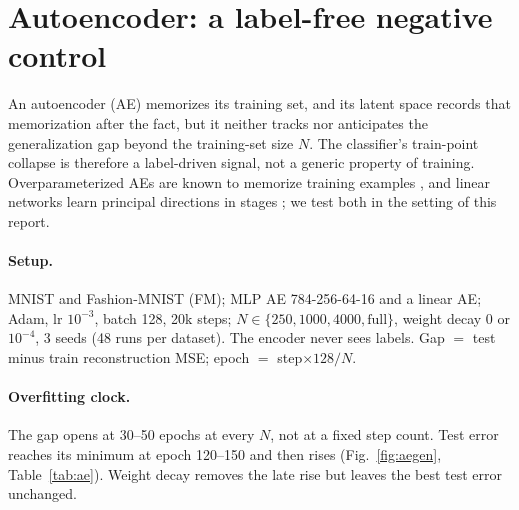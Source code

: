 \documentclass[10pt]{article}
\begin{document}
\section{Autoencoder: a label-free negative control}\label{sec:ae}
An autoencoder (AE) memorizes its training set, and its latent space records that memorization after the fact, but it neither tracks nor anticipates the generalization gap beyond the training-set size $N$. The classifier's train-point collapse is therefore a label-driven signal, not a generic property of training. Overparameterized AEs are known to memorize training examples \citep{radhakrishnan2018memorization,radhakrishnan2020overparameterized}, and linear networks learn principal directions in stages \citep{saxe2014exact,saxe2019mathematical}; we test both in the setting of this report.

\paragraph{Setup.} MNIST and Fashion-MNIST (FM); MLP AE 784-256-64-16 and a linear AE; Adam, lr $10^{-3}$, batch 128, 20k steps; $N\in\{250,1000,4000,\text{full}\}$, weight decay 0 or $10^{-4}$, 3 seeds (48 runs per dataset). The encoder never sees labels. Gap $=$ test minus train reconstruction MSE; epoch $=$ step$\times128/N$.

\paragraph{Overfitting clock.} The gap opens at 30--50 epochs at every $N$, not at a fixed step count. Test error reaches its minimum at epoch 120--150 and then rises (Fig.~\ref{fig:aegen}, Table~\ref{tab:ae}). Weight decay removes the late rise but leaves the best test error unchanged.
\end{document}
